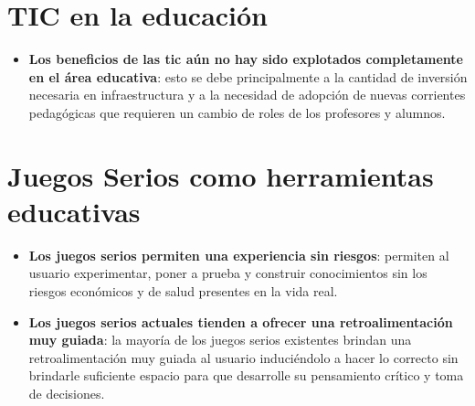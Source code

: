 \section[TIC en la educación]%
{TIC en la educación}

\begin{itemize}

\item \textbf{Los beneficios de las \gls{tic} aún no hay sido explotados completamente en el área educativa}: esto se debe principalmente a la cantidad de inversión necesaria en infraestructura y a la necesidad de adopción de nuevas corrientes pedagógicas que requieren un cambio de roles de los profesores y alumnos\cite{unesco2013tics}.


\end{itemize}

\section[Juegos Serios]%
{Juegos Serios como herramientas educativas}

\begin{itemize}

\item \textbf{Los juegos serios permiten una experiencia sin riesgos}: permiten  al usuario experimentar, poner a prueba y construir conocimientos sin los riesgos económicos y de salud presentes en la vida real\cite{sg:aoverview}.

\item \textbf{Los juegos serios actuales tienden a ofrecer una retroalimentación muy guiada}: la mayoría de los juegos serios existentes brindan una retroalimentación muy guiada al usuario induciéndolo a hacer lo correcto sin brindarle suficiente espacio para que desarrolle su pensamiento crítico y toma de decisiones.

\end{itemize}

